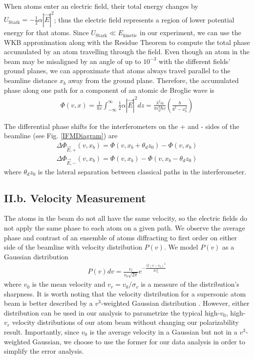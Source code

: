 \documentclass[twocolumn,prl,showpacs,superscriptaddress]{revtex4-1}   %
\newcommand{\figref}[1]{Fig. \ref{#1}}
\begin{document}
When atoms enter an electric field, their total energy changes by $U_{\mathrm{Stark}} = -\frac{1}{2}\alpha|\vec{E}|^2$; thus the electric field represents a region of lower potential energy for that atoms.
Since $U_{\mathrm{Stark}} \ll E_{\mathrm{kinetic}}$ in our experiment, we can use the WKB approximation along with the Residue Theorem to compute the total phase accumulated by an atom travelling through the field.
Even though an atom in the beam may be misaligned by an angle of up to $10^{-3}$ with the different fields' ground planes, we can approximate that atoms always travel parallel to the beamline distance $x_b$ away from the ground plane. Therefore, the accumulated phase along one path for a component of an atomic de Broglie wave is
\begin{align}
	\Phi(v,x) = 
	\frac{1}{\hbar v} \int_{-\infty}^{\infty} \frac{1}{2} \alpha |\vec{E}|^2 dz =	
	\frac{\lambda^2 \alpha}{\pi \epsilon_0^2 \hbar v}
	\left( \frac{b}{b^2-x_b^2} \right)
	\label{accumPhasePillars}
\end{align}

The differential phase shifts for the interferometers on the + and - sides of the beamline (see \figref{IFMDiagram}) are
\begin{align}
	\Delta\Phi_{\vec{E},+}(v,x_b) = \Phi(v, x_b+\theta_d z_0) - \Phi(v, x_b) \nonumber \\
	\Delta\Phi_{\vec{E},-}(v,x_b) = \Phi(v, x_b) - \Phi(v, x_b-\theta_d z_0)
	\label{deltaPhasePillars}
\end{align}
where $\theta_d z_0$ is the lateral separation between classical paths in the interferometer. 

\subsection{II.b. Velocity Measurement}

The atoms in the beam do not all have the same velocity, so the electric fields do not apply the same phase to each atom on a given path.
We observe the average phase and contrast of an ensemble of atoms diffracting to first order on either side of the beamline with velocity distribution $P(v)$. 
We model $P(v)$ as a Gaussian distribution
\begin{align}
	P(v)dv = \frac{v_r}{v_0\sqrt{2\pi}}e^{-\frac{v_r^2(v-v_0)^2}{2v_0^2}}
	\label{PvelGaussian}
\end{align}
where $v_0$ is the mean velocity and $v_r = v_0/\sigma_v$ is a measure of the distribution's sharpness. It is worth noting that the velocity distribution for a supersonic atom beam is better described by a $v^3$-weighted Gaussian distribution
\cite{Berman1997}. However, either distribution can be used in our analysis to parametrize the typical high-$v_0$, high-$v_r$ velocity distributions of our atom beam without changing our polarizability result. Importantly, since $v_0$ is the average velocity in a Gaussian but not in a $v^3$-weighted Gaussian, we choose to use the former for our data analysis in order to simplify the error analysis. 
\end{document}
